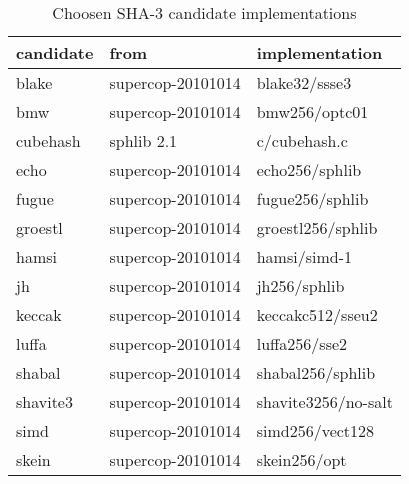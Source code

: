 \begin{table}
  \centering
  \begin{tabular}{ | l | l | l | }
    \hline
    \textbf{candidate} & \textbf{from} & \textbf{implementation} \\ \hline
     blake      & supercop-20101014 & blake32/ssse3 \\ \hline
     bmw        & supercop-20101014 & bmw256/optc01 \\ \hline
     cubehash   & sphlib 2.1        & c/cubehash.c  \\ \hline
     echo       & supercop-20101014 & echo256/sphlib\\ \hline
     fugue      & supercop-20101014 & fugue256/sphlib\\ \hline
     groestl    & supercop-20101014 & groestl256/sphlib\\ \hline
     hamsi      & supercop-20101014 & hamsi/simd-1  \\ \hline
     jh         & supercop-20101014 & jh256/sphlib  \\ \hline
     keccak     & supercop-20101014 & keccakc512/sseu2 \\ \hline
     luffa      & supercop-20101014 & luffa256/sse2 \\ \hline
     shabal     & supercop-20101014 & shabal256/sphlib\\ \hline
     shavite3   & supercop-20101014 & shavite3256/no-salt       \\ \hline
     simd       & supercop-20101014 & simd256/vect128 \\ \hline
     skein      & supercop-20101014 & skein256/opt           \\ \hline
  \end{tabular}
  \caption{Choosen \ac{SHA}-3 candidate implementations}
  \label{tbl:sha3:implementations}
\end{table}
